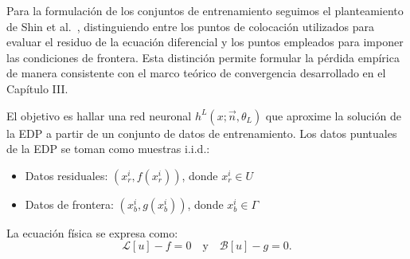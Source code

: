 Para la formulación de los conjuntos de entrenamiento seguimos el planteamiento de Shin et al.~\cite{shin2020convergence}, distinguiendo entre los puntos de colocación utilizados para evaluar el residuo de la ecuación diferencial y los puntos empleados para imponer las condiciones de frontera. Esta distinción permite formular la pérdida empírica de manera consistente con el marco teórico de convergencia desarrollado en el Capítulo III.

El objetivo es hallar una red neuronal \( h^{L}(x; \overrightarrow{n}, \theta_{L}) \) que aproxime la solución de la EDP a partir de un conjunto de datos de entrenamiento. Los datos puntuales de la EDP se toman como muestras i.i.d.:
\begin{itemize}
    \item Datos residuales: \( (x^{i}_{r}, f(x^{i}_{r})) \), donde \( x^{i}_{r} \in U \)
    \item Datos de frontera: \( (x^{i}_{b}, g(x^{i}_{b})) \), donde \( x^{i}_{b} \in \Gamma \)
\end{itemize}

La ecuación física se expresa como:
\[
\mathcal{L}[u] - f = 0 \quad \text{y} \quad \mathcal{B}[u] - g = 0.
\]


